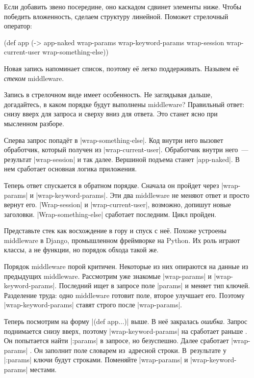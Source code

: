 Если добавить звено посередине, оно каскадом сдвинет элементы ниже. Чтобы
победить вложенность, сделаем структуру линейной. Поможет стрелочный оператор:


\begin{english}
  \begin{clojure/lines}
(def app
  (-> app-naked
      wrap-params
      wrap-keyword-params
      wrap-session
      wrap-current-user
      wrap-something-else))
  \end{clojure/lines}
\end{english}


Новая запись напоминает список, поэтому е\"{е} легко поддерживать. Назывем е\"{е}
\emph{стеком} middleware.

Запись в стрелочном виде имеет особенность. Не заглядывая дальше, догадайтесь, в
каком порядке будут выполнены middleware? Правильный ответ: снизу вверх для
запроса и сверху вниз для ответа. Это станет ясно при мысленном разборе.

Сперва запрос попад\"{е}т в \spverb|wrap-something-else|. Код внутри него вызовет
обработчик, который получен из \spverb|wrap-current-user|. Обработчик внутри
него~--- результат \spverb|wrap-session| и так далее. Вершиной подъема станет
\spverb|app-naked|. В нем сработает основная логика приложения.

Теперь ответ спускается в обратном порядке. Сначала он пройдет через
\spverb|wrap-params| и \spverb|wrap-keyword-params|. Эти два middleware не
меняют ответ и просто вернут его. \spverb|Wrap-session| и
\spverb|wrap-current-user|, возможно, допишут новые заголовки.
\spverb|Wrap-something-else| сработает последним. Цикл пройден.

Представьте стек как восхождение в гору и спуск с не\"{е}. Похоже устроены
middleware в Django, промышленном фреймворке на Python. Их роль играют классы, а
не функции, но порядок обхода такой же.

Порядок middleware порой критичен. Некоторые из них опираются на данные из
предыдущих middleware. Рассмотрим уже знакомые \spverb|wrap-params| и
\spverb|wrap-keyword-params|. Последний ищет в запросе поле \spverb|params| и
меняет тип ключей. Разделение труда: одно middleware готовит поле, второе
улучшает его. Поэтому \spverb|wrap-keyword-params| ставят строго после
\spverb|wrap-params|.

Теперь посмотрим на форму \spverb|(def app...)| выше. В не\"{е} закралась
\emph{ошибка}. Запрос поднимается снизу вверх, поэтому
\spverb|wrap-keyword-params| на сработает раньше . Он попытается
найти \spverb|:params| в запросе, но безуспешно. Далее сработает
\spverb|wrap-params| . Он заполнит поле словарем из~адресной
строки. В~результате у \spverb|:params| ключи будут строками. Поменяйте
\spverb|wrap-params| и \spverb|wrap-keyword-params| местами.

